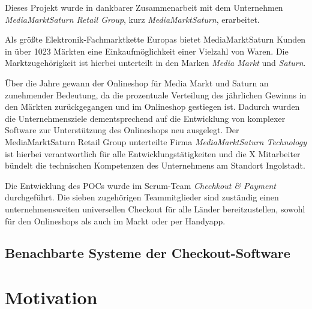 Dieses Projekt wurde in dankbarer Zusammenarbeit mit dem Unternehmen \emph{MediaMarktSaturn Retail Group}, kurz \emph{MediaMarktSaturn}, erarbeitet. %

Als größte Elektronik-Fachmarktkette Europas bietet MediaMarktSaturn Kunden in über 1023 Märkten eine Einkaufmöglichkeit einer Vielzahl von Waren. Die Marktzugehörigkeit ist hierbei unterteilt in den Marken \emph{Media Markt} und \emph{Saturn}. %

Über die Jahre gewann der Onlineshop für Media Markt und Saturn an zunehmender Bedeutung, da die prozentuale Verteilung des jährlichen Gewinns in den Märkten zurückgegangen und im Onlineshop gestiegen ist. Dadurch wurden die Unternehmensziele dementsprechend auf die Entwicklung von komplexer Software zur Unterstützung des Onlineshops neu ausgelegt. Der MediaMarktSaturn Retail Group unterteilte Firma \emph{MediaMarktSaturn Technology} ist hierbei verantwortlich für alle Entwicklungstätigkeiten und die {\color{red}X} Mitarbeiter bündelt die technischen Kompetenzen des Unternehmens am Standort Ingolstadt. %

Die Entwicklung des \acrshort{POC}s wurde im \Gls{Scrum}-Team \emph{Chechkout \& Payment} durchgeführt. Die sieben zugehörigen Teammitglieder sind zuständig einen unternehmensweiten universellen Checkout für alle Länder bereitzustellen, sowohl für den Onlineshops als auch im Markt oder per Handyapp. 

\subsection{Benachbarte Systeme der Checkout-Software}

\section{Motivation}


